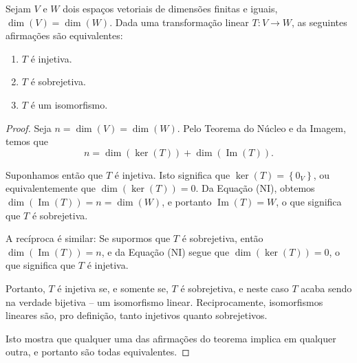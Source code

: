 \begin{theorem}
	Sejam $V$ e $W$ dois espaços vetoriais de dimensões finitas e iguais, $\dim(V)=\dim(W)$. Dada uma transformação linear $T\colon V\to W$, as seguintes afirmações são equivalentes:
	\begin{enumerate}
		\item $T$ é injetiva.
		\item $T$ é sobrejetiva.
		\item $T$ é um isomorfismo.
	\end{enumerate}
\end{theorem}

\begin{proof}
	Seja $n=\dim(V)=\dim(W)$. Pelo Teorema do Núcleo e da Imagem, temos que
	\[n=\dim(\ker(T))+\dim(\operatorname{Im}(T)).\tag{NI}\]
	
	Suponhamos então que $T$ é injetiva. Isto significa que $\ker(T)=\left\{0_V\right\}$, ou equivalentemente que $\dim(\ker(T))=0$. Da Equação (NI), obtemos $\dim(\operatorname{Im}(T))=n=\dim(W)$, e portanto $\operatorname{Im}(T)=W$, o que significa que $T$ é sobrejetiva.
	
	A recíproca é similar: Se supormos que $T$ é sobrejetiva, então $\dim(\operatorname{Im}(T))=n$, e da Equação (NI) segue que $\dim(\ker(T))=0$, o que significa que $T$ é injetiva.
	
	Portanto, $T$ é injetiva se, e somente se, $T$ é sobrejetiva, e neste caso $T$ acaba sendo na verdade bijetiva -- um isomorfismo linear. Reciprocamente, isomorfismos lineares são, pro definição, tanto injetivos quanto sobrejetivos.
	
	Isto mostra que qualquer uma das afirmações do teorema implica em qualquer outra, e portanto são todas equivalentes.
\end{proof}
